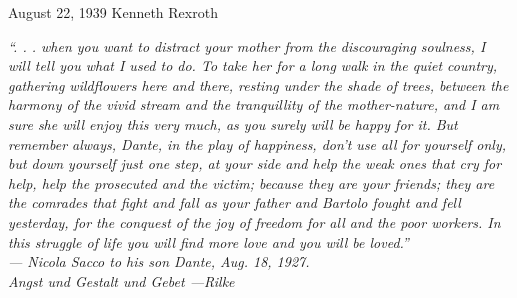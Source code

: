 \begin{poem}
    {August 22, 1939}
    {Kenneth Rexroth}

    \textit{``. . . when you want to distract your mother from the
      discouraging soulness, I will tell you what I used to do. To
      take her for a long walk in the quiet country, gathering
      wildflowers here and there, resting under the shade of trees,
      between the harmony of the vivid stream and the tranquillity of
      the mother-nature, and I am sure she will enjoy this very much,
      as you surely will be happy for it. But remember always, Dante,
      in the play of happiness, don't use all for yourself only, but
      down yourself just one step, at your side and help the weak
      ones that cry for help, help the prosecuted and the victim;
      because they are your friends; they are the comrades that fight
      and fall as your father and Bartolo fought and fell yesterday,
      for the conquest of the joy of freedom for all and the poor
      workers. In this struggle of life you will find more love and
      you will be loved.'' \\ 

      --- Nicola Sacco to his son Dante, Aug. 18, 1927.}\\

     \textit{Angst und Gestalt und Gebet ---Rilke}\\ 


\end{poem}
